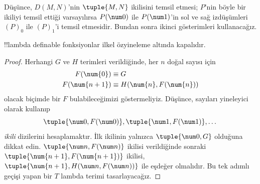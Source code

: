 \documentclass[../../../include/open-logic-section]{subfiles}
\begin{document}
Düşünce, $D(M,N)$'nin $\tuple{M,N}$ ikilisini temsil etmesi; $P$'nin böyle
bir ikiliyi temsil ettiği varsayılırsa $P(\num 0)$ ile $P(\num 1)$'in sol ve
sağ izdüşümleri $(P)_0$ ile $(P)_1$'i temsil etmesidir. Bundan sonra ikinci
gösterimleri kullanacağız.

\begin{lem}
!!{lambda definable} fonksiyonlar ilkel özyineleme altında kapalıdır.
\end{lem}

\begin{proof}
Herhangi $G$ ve $H$ terimleri verildiğinde, her $n$ doğal sayısı için
\begin{align*}
F(\num{0}) & \equiv G \\
F(\num{n+1}) & \equiv H(\num{n}, F(\num{n}))
\end{align*}
olacak biçimde bir $F$ bulabileceğimizi göstermeliyiz. Düşünce, sayıları
yineleyici olarak kullanıp
\[
\tuple{\num 0, F(\num 0)}, \tuple{\num 1, F(\num 1)}, \dots
\]
\emph{ikili} dizilerini hesaplamaktır. İlk ikilinin yalnızca
$\tuple{\num 0,G}$ olduğuna dikkat edin. $\tuple{\num n,F(\num n)}$ ikilisi
verildiğinde sonraki $\tuple{\num{n+1},F(\num{n+1})}$ ikilisi,
$\tuple{\num{n+1},H(\num n,F(\num n))}$ ile eşdeğer olmalıdır. Bu tek adımlı
geçişi yapan bir $T$ lambda terimi tasarlayacağız.


\end{proof}
\end{document}
